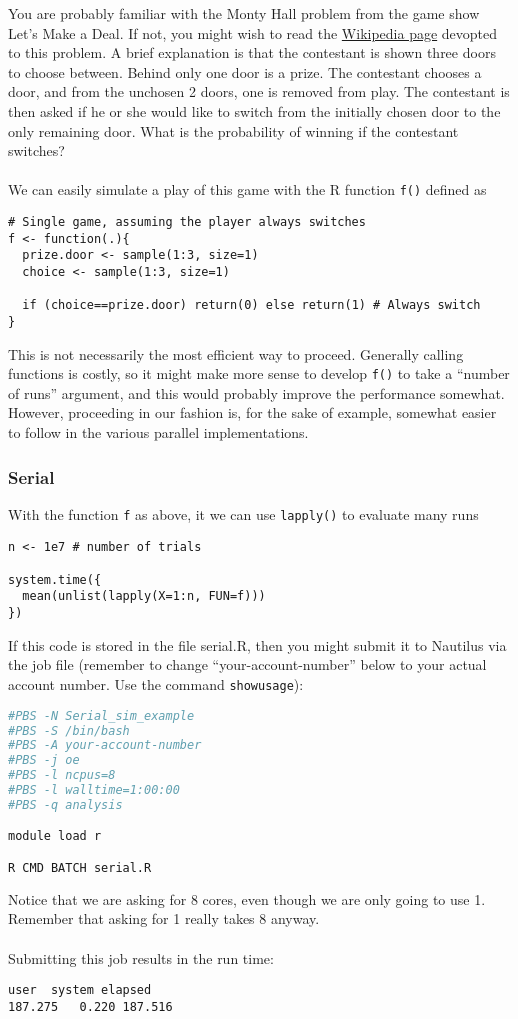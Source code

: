 
\label{egsec}
You are probably familiar with the Monty Hall problem from the game show Let's Make a Deal.  If not, you might wish to read the \href{https://en.wikipedia.org/wiki/Monty_Hall_problem}{Wikipedia page} devopted to this problem.  A brief explanation is that the contestant is shown three doors to choose between.  Behind only one door is a prize.  The contestant chooses a door, and from the unchosen 2 doors, one is removed from play.  The contestant is then asked if he or she would like to switch from the initially chosen door to the only remaining door.  What is the probability of winning if the contestant switches?\\\\
%
We can easily simulate a play of this game with the R function \texttt{f()} defined as
\begin{lstlisting}[language=rr]
# Single game, assuming the player always switches
f <- function(.){
  prize.door <- sample(1:3, size=1)
  choice <- sample(1:3, size=1)

  if (choice==prize.door) return(0) else return(1) # Always switch
}
\end{lstlisting}

This is not necessarily the most efficient way to proceed.  Generally calling functions is costly, so it might make more sense to develop \texttt{f()} to take a ``number of runs'' argument, and this would probably improve the performance somewhat.  However, proceeding in our fashion is, for the sake of example, somewhat easier to follow in the various parallel implementations.

\subsubsection{Serial}
With the function \texttt{f} as above, it we can use \texttt{lapply()} to evaluate many runs
\begin{lstlisting}[language=rr]
n <- 1e7 # number of trials

system.time({
  mean(unlist(lapply(X=1:n, FUN=f)))
})
\end{lstlisting}
If this code is stored in the file serial.R, then you might submit it to Nautilus via the job file (remember to change ``your-account-number'' below to your actual account number.  Use the command \texttt{showusage}):
\begin{lstlisting}[language=sh]
#PBS -N Serial_sim_example
#PBS -S /bin/bash
#PBS -A your-account-number
#PBS -j oe
#PBS -l ncpus=8
#PBS -l walltime=1:00:00
#PBS -q analysis

module load r

R CMD BATCH serial.R
\end{lstlisting}%
Notice that we are asking for 8 cores, even though we are only going to use 1.  Remember that asking for 1 really takes 8 anyway.\\\\
%
Submitting this job results in the run time:
\begin{lstlisting}[language=rr]
   user  system elapsed 
187.275   0.220 187.516 
\end{lstlisting}


